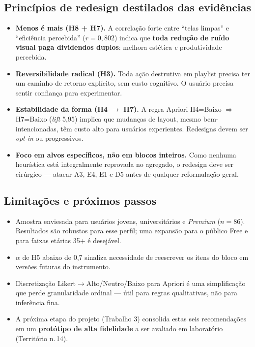 \documentclass[12pt,a4paper]{article}
\begin{document}
\subsection*{Princípios de redesign destilados das evidências}
\begin{itemize}[leftmargin=*]
  \item \textbf{Menos é mais (H8 + H7).} A correlação forte entre ``telas limpas''
        e ``eficiência percebida'' ($r = 0{,}802$) indica que \textbf{toda redução de
        ruído visual paga dividendos duplos}: melhora estética \emph{e} produtividade
        percebida.
  \item \textbf{Reversibilidade radical (H3).} Toda ação destrutiva em playlist
        precisa ter um caminho de retorno explícito, sem custo cognitivo. O usuário
        precisa sentir confiança para experimentar.
  \item \textbf{Estabilidade da forma (H4 $\to$ H7).} A regra Apriori
        H4=Baixo $\Rightarrow$ H7=Baixo (\emph{lift} 5{,}95) implica que mudanças
        de layout, mesmo bem-intencionadas, têm custo alto para usuários experientes.
        Redesigns devem ser \emph{opt-in} ou progressivos.
  \item \textbf{Foco em alvos específicos, não em blocos inteiros.} Como nenhuma
        heurística está integralmente reprovada no agregado, o redesign deve ser
        cirúrgico --- atacar A3, E4, E1 e D5 antes de qualquer reformulação geral.
\end{itemize}

\subsection*{Limitações e próximos passos}
\begin{itemize}[leftmargin=*]
  \item Amostra enviesada para usuários jovens, universitários e \emph{Premium}
        ($n=86$). Resultados são robustos para esse perfil; uma expansão para o
        público Free e para faixas etárias 35+ é desejável.
  \item $\alpha$ de H5 abaixo de 0{,}7 sinaliza necessidade de reescrever os itens
        do bloco em versões futuras do instrumento.
  \item Discretização Likert$\to$Alto/Neutro/Baixo para Apriori é uma simplificação
        que perde granularidade ordinal --- útil para regras qualitativas, não para
        inferência fina.
  \item A próxima etapa do projeto (Trabalho 3) consolida estas seis recomendações
        em um \textbf{protótipo de alta fidelidade} a ser avaliado em laboratório
        (Território n.\,14).
\end{itemize}
\end{document}
